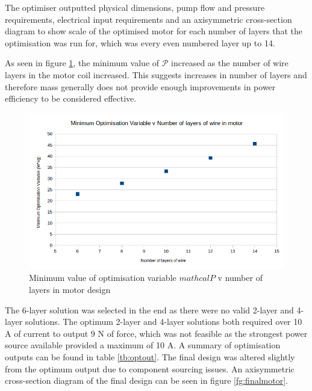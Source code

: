 \documentclass[a4paper,12pt]{article}
\begin{document}
The optimiser outputted physical dimensions, pump flow and pressure requirements, electrical input requirements and an axisymmetric cross-section diagram to show scale of the optimised motor for each number of layers that the optimisation was run for, which was every even numbered layer up to 14.

As seen in figure \ref{fg:optvariable}, the minimum value of $\mathcal{P}$ increased as the number of wire layers in the motor coil increased. This suggests increases in number of layers and therefore mass generally does not provide enough improvements in power efficiency to be considered effective.

\begin{figure}[h!]
    \centering
    \includegraphics[width=\textwidth]{[P]_v_layers.png}
    \caption{Minimum value of optimisation variable $mathcal{P}$ v number of layers in motor design}
    \label{fg:optvariable}
\end{figure}

The 6-layer solution was selected in the end as there were no valid 2-layer and 4-layer solutions. The optimum 2-layer and 4-layer solutions both required over 10 A of current to output 9 N of force, which was not feasible as the strongest power source available provided a maximum of 10 A. A summary of optimisation outputs can be found in table \ref{tb:optout}. The final design was altered slightly from the optimum output due to component sourcing issues. An axisymmetric cross-section diagram of the final design can be seen in figure \ref{fg:finalmotor}.
\end{document}

